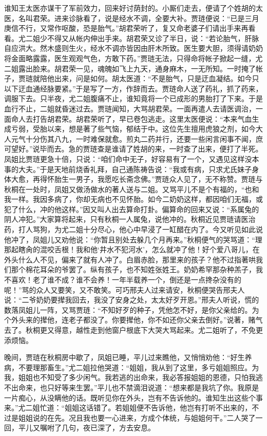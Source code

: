 \begin{parag}
    谁知王太医亦谋干了军前效力，回来好讨荫封的。小厮们走去，便请了个姓胡的太医，名叫君荣。进来诊脉看了，说是经水不调，全要大补。贾琏便说：“已是三月庚信不行，又常作呕酸，恐是胎气。”胡君荣听了，复又命老婆子们请出手来再看看。尤二姐少不得又从帐内伸出手来。胡君荣又诊了半日，说：“若论胎气，肝脉自应洪大。然木盛则生火，经水不调亦皆因由肝木所致。医生要大胆，须得请奶奶将金面略露露，医生观观气色，方敢下药。”贾琏无法，只得命将帐子掀起一缝，尤二姐露出脸来。胡君荣一见，魂魄如飞上九天，通身麻木，一无所知。一时掩了帐子，贾琏就陪他出来，问是如何。胡太医道：“不是胎气，只是迂血凝结。如今只以下迂血通经脉要紧。”于是写了一方，作辞而去。贾琏命人送了药礼，抓了药来，调服下去。只半夜，尤二姐腹痛不止，谁知竟将一个已成形的男胎打了下来。于是血行不止，二姐就昏迷过去。贾琏闻知，大骂胡君荣。一面再遣人去请医调治，一面命人去打告胡君荣。胡君荣听了，早已卷包逃走。这里太医便说：“本来气血生成亏弱，受胎以来，想是著了些气恼，郁结于中。这位先生擅用虎狼之剂，如今大人元气十分伤其八九，一时难保就愈。煎丸二药并行，还要一些闲言闲事不闻，庶可望好。”说毕而去。急的贾琏查是谁请了姓胡的来，一时查了出来，便打了半死。凤姐比贾琏更急十倍，只说：“咱们命中无子，好容易有了一个，又遇见这样没本事的大夫。”于是天地前烧香礼拜，自己通陈祷告说：“我或有病，只求尤氏妹子身体大愈，再得怀胎生一男子，我愿吃长斋念佛。”贾琏众人见了，无不称赞。贾琏与秋桐在一处时，凤姐又做汤做水的著人送与二姐。又骂平儿不是个有福的，“也和我一样。我因多病了，你却无病也不见怀胎。如今二奶奶这样，都因咱们无福，或犯了什么，冲的他这样。”因又叫人出去算命打卦。偏算命的回来又说：“系属兔的阴人冲犯。”大家算将起来，只有秋桐一人属兔，说他冲的。秋桐近见贾琏请医治药，打人骂狗，为尤二姐十分尽心，他心中早浸了一缸醋在内了。今又听见如此说他冲了，凤姐儿又劝他说：“你暂且别处去躲几个月再来。”秋桐便气的哭骂道：“理那起瞎肏的混咬舌根！我和他‘井水不犯河水’，怎么就冲了他！好个爱八哥儿，在外头什么人不见，偏来了就有人冲了。白眉赤脸，那里来的孩子？他不过指著哄我们那个棉花耳朵的爷罢了。纵有孩子，也不知姓张姓王。奶奶希罕那杂种羔子，我不喜欢！老了谁不成？谁不会养！一年半载养一个，倒还是一点搀杂没有的呢！”骂的众人又要笑，又不敢笑。可巧邢夫人过来请安，秋桐便哭告邢夫人说：“二爷奶奶要撵我回去，我没了安身之处，太太好歹开恩。”邢夫人听说，慌的数落凤姐儿一阵，又骂贾琏：“不知好歹的种子，凭他怎不好，是你父亲给的。为个外头来的撵他，连老子都没了。你要撵他，你不如还你父亲去倒好。”说著，赌气去了。秋桐更又得意，越性走到他窗户根底下大哭大骂起来。尤二姐听了，不免更添烦恼。
\end{parag}


\begin{parag}
    晚间，贾琏在秋桐房中歇了，凤姐已睡，平儿过来瞧他，又悄悄劝他：“好生养病，不要理那畜生。”尤二姐拉他哭道：“姐姐，我从到了这里，多亏姐姐照应。为我，姐姐也不知受了多少闲气。我若逃的出命来，我必答报姐姐的恩德，只怕我逃不出命来，也只好等来生罢。”平儿也不禁滴泪说道：“想来都是我坑了你。我原是一片痴心，从没瞒他的话。既听见你在外头，岂有不告诉他的。谁知生出这些个事来。”尤二姐忙道：“姐姐这话错了。若姐姐便不告诉他，他岂有打听不出来的，不过是姐姐说的在先。况且我也要一心进来，方成个体统，与姐姐何干。”二人哭了一回，平儿又嘱咐了几句，夜已深了，方去安息。
\end{parag}


